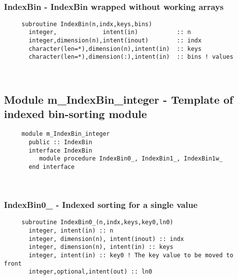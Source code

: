\mbox{}\hrulefill\ 
 

  \subsubsection{IndexBin - IndexBin wrapped without working arrays}
  
\begin{verbatim} 
     subroutine IndexBin(n,indx,keys,bins)
       integer,             intent(in)           :: n
       integer,dimension(n),intent(inout)        :: indx
       character(len=*),dimension(n),intent(in)  :: keys
       character(len=*),dimension(:),intent(in)  :: bins ! values
 \end{verbatim}
%


 
 
\mbox{}\hrulefill\ 
 

  \subsection{Module m\_IndexBin\_integer - Template of indexed bin-sorting module }

\begin{verbatim} 
     module m_IndexBin_integer
       public :: IndexBin
       interface IndexBin
          module procedure IndexBin0_, IndexBin1_, IndexBin1w_
       end interface
 \end{verbatim}
%
 
 
\mbox{}\hrulefill\ 
 
  \subsubsection{IndexBin0\_ - Indexed sorting for a single value}

\begin{verbatim} 
     subroutine IndexBin0_(n,indx,keys,key0,ln0)
       integer, intent(in) :: n
       integer, dimension(n), intent(inout) :: indx
       integer, dimension(n), intent(in) :: keys
       integer, intent(in) :: key0 ! The key value to be moved to front
       integer,optional,intent(out) :: ln0
 \end{verbatim} %
 
